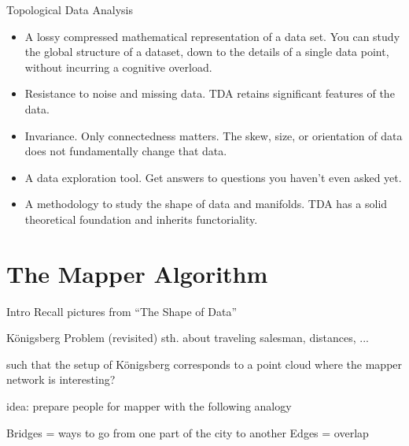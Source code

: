 \documentclass{beamer}
\begin{document}
\begin{frame}{Topological Data Analysis}
\begin{itemize}
	\item A lossy compressed mathematical representation of a data set. You can study the global structure of a dataset, down to the details of a single data point, without incurring a cognitive overload.
	\item Resistance to noise and missing data. TDA retains significant features of the data.
	\item Invariance. Only connectedness matters. The skew, size, or orientation of data does not fundamentally change that data.
	\item A data exploration tool. Get answers to questions you haven’t even asked yet.
  \item A methodology to study the shape of data and manifolds. TDA has a solid theoretical foundation and inherits functoriality.
\end{itemize}
\end{frame}




\section{The Mapper Algorithm}

\begin{frame}{Intro}
Recall pictures from ``The Shape of Data''
\end{frame}


\begin{frame}{Königsberg Problem (revisited)}
sth. about traveling salesman, distances, ...

such that the setup of Königsberg corresponds to a point cloud where the mapper network is interesting?

idea: prepare people for mapper with the following analogy

Bridges = ways to go from one part of the city to another
Edges = overlap
\end{frame}
\end{document}
